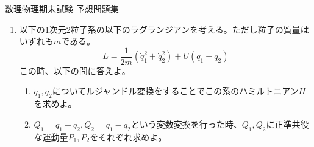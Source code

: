 \documentclass{jsarticle}
\begin{document}
\begin{center}
  {\huge 数理物理期末試験 予想問題集}\\
\end{center}

\begin{enumerate}
  \item 以下の1次元2粒子系の以下のラグランジアンを考える。ただし粒子の質量はいずれも$m$である。
        $$
          L = \frac{1}{2m}(\dot{q}_1^2+\dot{q}_2^2) + U(q_1-q_2)
        $$
        この時、以下の問に答えよ。
        \begin{enumerate}
          \item $\dot{q}_1, \dot{q}_2$についてルジャンドル変換をすることでこの系のハミルトニアン$H$を求めよ。
          \item $Q_1 = q_1 + q_2, Q_2 = q_1 - q_2$という変数変換を行った時、$Q_1, Q_2$に正準共役な運動量$P_1, P_2$をそれぞれ求めよ。
        \end{enumerate}

\end{enumerate}
\end{document}
